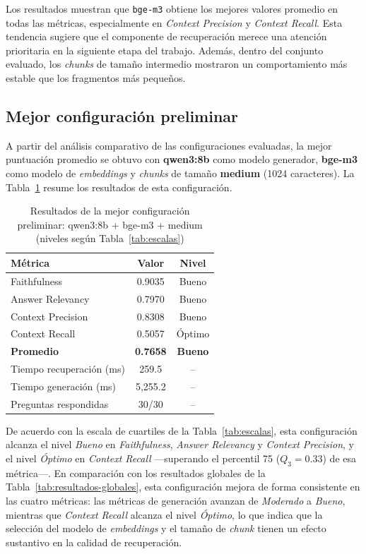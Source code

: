 \documentclass{article}
\begin{document}
Los resultados muestran que \texttt{bge-m3} obtiene los mejores valores promedio en todas las métricas, especialmente en \textit{Context Precision} y \textit{Context Recall}. Esta tendencia sugiere que el componente de recuperación merece una atención prioritaria en la siguiente etapa del trabajo. Además, dentro del conjunto evaluado, los \textit{chunks} de tamaño intermedio mostraron un comportamiento más estable que los fragmentos más pequeños.

\subsection{Mejor configuración preliminar}

A partir del análisis comparativo de las configuraciones evaluadas, la mejor puntuación promedio se obtuvo con \textbf{qwen3:8b} como modelo generador, \textbf{bge-m3} como modelo de \textit{embeddings} y \textit{chunks} de tamaño \textbf{medium} (1024 caracteres). La Tabla~\ref{tab:mejor-config} resume los resultados de esta configuración.

\begin{table}[H]
\centering
\begin{tabular}{|l|c|c|}
\hline
\textbf{Métrica} & \textbf{Valor} & \textbf{Nivel} \\
\hline
Faithfulness        & 0.9035 & Bueno   \\
Answer Relevancy    & 0.7970 & Bueno   \\
Context Precision   & 0.8308 & Bueno   \\
Context Recall      & 0.5057 & Óptimo  \\
\textbf{Promedio}   & \textbf{0.7658} & \textbf{Bueno} \\
\hline
Tiempo recuperación (ms) & 259.5 & -- \\
Tiempo generación (ms) & 5{,}255.2 & -- \\
Preguntas respondidas & 30/30 & -- \\
\hline
\end{tabular}
\caption{Resultados de la mejor configuración preliminar: qwen3:8b + bge-m3 + medium (niveles según Tabla~\ref{tab:escalas})}
\label{tab:mejor-config}
\end{table}

De acuerdo con la escala de cuartiles de la Tabla~\ref{tab:escalas}, esta configuración alcanza el nivel \textit{Bueno} en \textit{Faithfulness}, \textit{Answer Relevancy} y \textit{Context Precision}, y el nivel \textit{Óptimo} en \textit{Context Recall} —superando el percentil 75 ($Q_3 = 0.33$) de esa métrica—. En comparación con los resultados globales de la Tabla~\ref{tab:resultados-globales}, esta configuración mejora de forma consistente en las cuatro métricas: las métricas de generación avanzan de \textit{Moderado} a \textit{Bueno}, mientras que \textit{Context Recall} alcanza el nivel \textit{Óptimo}, lo que indica que la selección del modelo de \textit{embeddings} y el tamaño de \textit{chunk} tienen un efecto sustantivo en la calidad de recuperación.
\end{document}
